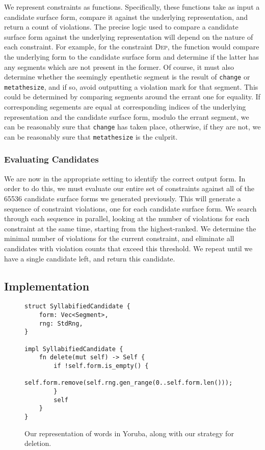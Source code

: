 \documentclass[12pt]{article}
\begin{document}
We represent constraints as functions. Specifically, these functions take as
input a candidate surface form, compare it against the underlying
representation, and return a count of violations. The precise logic used to
compare a candidate surface form against the underlying representation will
depend on the nature of each constraint. For example, for the constraint
\textsc{Dep}, the function would compare the underlying form to the candidate
surface form and determine if the latter has any segments which are not present
in the former. Of course, it must also determine whether the seemingly
epenthetic segment is the result of \texttt{change} or \texttt{metathesize},
and if so, avoid outputting a violation mark for that segment. This could be
determined by comparing segments around the errant one for equality. If
corresponding segements are equal at corresponding indices of the underlying
representation and the candidate surface form, modulo the errant segment, we
can be reasonably sure that \texttt{change} has taken place, otherwise, if
they are not, we can be reasonably sure that \texttt{metathesize} is the
culprit.

\subsubsection{Evaluating Candidates}

We are now in the appropriate setting to identify the correct output form. In
order to do this, we must evaluate our entire set of constraints against all of
the 65536 candidate surface forms we generated previously. This will generate a
sequence of constraint violations, one for each candidate surface form. We
search through each sequence in parallel, looking at the number of violations
for each constraint at the same time, starting from the highest-ranked. We
determine the minimal number of violations for the current constraint, and
eliminate all candidates with violation counts that exceed this threshold. We
repeat until we have a single candidate left, and return this candidate.

\subsection{Implementation}

\begin{figure}[h]
\caption{Our representation of words in Yoruba, along with our strategy for deletion.}
\label{fig:impl-deletion}
\begin{verbatim}
struct SyllabifiedCandidate {
    form: Vec<Segment>,
    rng: StdRng,
}

impl SyllabifiedCandidate {
    fn delete(mut self) -> Self {
        if !self.form.is_empty() {
            self.form.remove(self.rng.gen_range(0..self.form.len()));
        }
        self
    }
}
\end{verbatim}
\end{figure}
\end{document}
